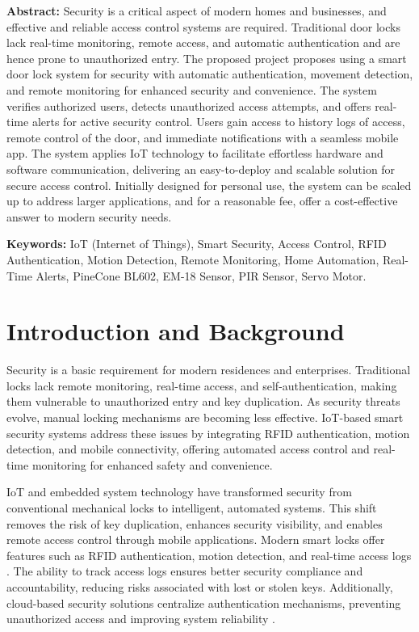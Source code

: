 \documentclass[a4paper]{scrartcl}
\title{\paperTitle}
\author{\paperAuthor{}~<zv.shivakumar@stud.fh-sm.de>, 316777}
\date{}
\begin{document}
\maketitle

\textbf{Abstract:} Security is a critical aspect of modern homes and businesses, and effective and reliable access control systems are required. Traditional door locks lack real-time monitoring, remote access, and automatic authentication and are hence prone to unauthorized entry. The proposed project proposes using a smart door lock system for security with automatic authentication, movement detection, and remote monitoring for enhanced security and convenience. The system verifies authorized users, detects unauthorized access attempts, and offers real-time alerts for active security control. Users gain access to history logs of access, remote control of the door, and immediate notifications with a seamless mobile app. The system applies IoT technology to facilitate effortless hardware and software communication, delivering an easy-to-deploy and scalable solution for secure access control. Initially designed for personal use, the system can be scaled up to address larger applications, and for a reasonable fee, offer a cost-effective answer to modern security needs.

\textbf{Keywords:} IoT (Internet of Things), Smart Security, Access Control, RFID Authentication, Motion Detection, Remote Monitoring, Home Automation, Real-Time Alerts, PineCone BL602, EM-18 Sensor, PIR Sensor, Servo Motor.

\section{Introduction and Background}
\label{sec:intro} 
Security is a basic requirement for modern residences and enterprises. Traditional locks lack remote monitoring, real-time access, and self-authentication, making them vulnerable to unauthorized entry and key duplication. As security threats evolve, manual locking mechanisms are becoming less effective. IoT-based smart security systems address these issues by integrating RFID authentication, motion detection, and mobile connectivity, offering automated access control and real-time monitoring for enhanced safety and convenience.

IoT and embedded system technology have transformed security from conventional mechanical locks to intelligent, automated systems. This shift removes the risk of key duplication, enhances security visibility, and enables remote access control through mobile applications. Modern smart locks offer features such as RFID authentication, motion detection, and real-time access logs \cite{Amin2018}. The ability to track access logs ensures better security compliance and accountability, reducing risks associated with lost or stolen keys. Additionally, cloud-based security solutions centralize authentication mechanisms, preventing unauthorized access and improving system reliability \cite{Tiwari2024}.
\end{document}
